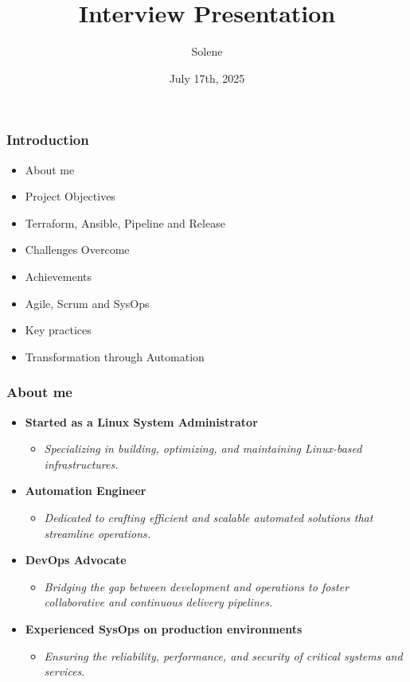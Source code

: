 \documentclass{beamer}
\title{Interview Presentation}
\author{Solene}
\date{July 17th, 2025}
\begin{document}
\frame{\titlepage}

\begin{frame}
\frametitle{Introduction}
\begin{itemize}
    \item About me
    \item Project Objectives
    \item Terraform, Ansible, Pipeline and Release
    \item Challenges Overcome
    \item Achievements
    \item Agile, Scrum and SysOps
    \item Key practices
    \item Transformation through Automation
\end{itemize}
\end{frame}

\begin{frame}
\frametitle{About me}
\begin{itemize}
    \item \textbf{Started as a Linux System Administrator}  
    \begin{itemize}
        \item \textit{Specializing in building, optimizing, and maintaining Linux-based infrastructures.}
    \end{itemize}

    \item \textbf{Automation Engineer}  
    \begin{itemize}
        \item  \textit{Dedicated to crafting efficient and scalable automated solutions that streamline operations.}
    \end{itemize}

    \item \textbf{DevOps Advocate}  
    \begin{itemize}
       \item  \textit{Bridging the gap between development and operations to foster collaborative and continuous delivery pipelines.}
    \end{itemize}

    \item \textbf{Experienced SysOps on production environments}  
    \begin{itemize}
        \item \textit{Ensuring the reliability, performance, and security of critical systems and services}.  
    \end{itemize}
\end{itemize}
\end{frame}
\end{document}
